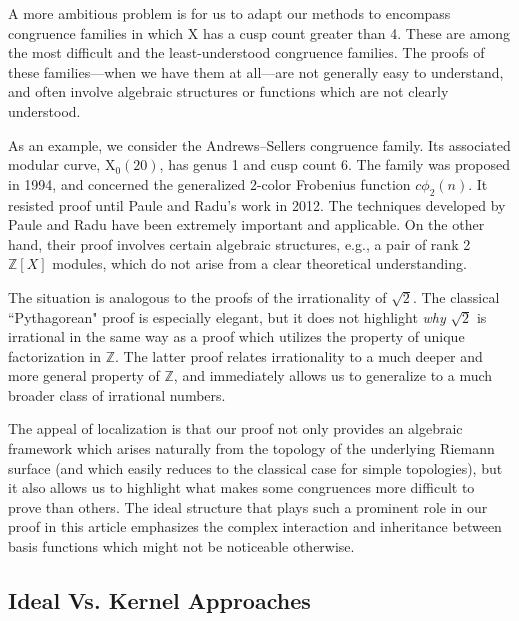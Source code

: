 \documentclass[reqno]{amsart}
\theoremstyle{definition}
\theoremstyle{remark}
\numberwithin{equation}{section}
\begin{document}
A more ambitious problem is for us to adapt our methods to encompass congruence families in which $\mathrm{X}$ has a cusp count greater than 4.  These are among the most difficult and the least-understood congruence families.  The proofs of these families---when we have them at all---are not generally easy to understand, and often involve algebraic structures or functions which are not clearly understood.  

As an example, we consider the Andrews--Sellers congruence family.  Its associated modular curve, $\mathrm{X}_0(20)$, has genus 1 and cusp count 6.  The family was proposed in 1994, and concerned the generalized 2-color Frobenius function $c\phi_2(n)$.  It resisted proof until Paule and Radu's work in 2012.  The techniques developed by Paule and Radu have been extremely important and applicable.  On the other hand, their proof involves certain algebraic structures, e.g., a pair of rank 2 $\mathbb{Z}[X]$ modules, which do not arise from a clear theoretical understanding.%

The situation is analogous to the proofs of the irrationality of $\sqrt{2}$.  The classical ``Pythagorean" proof is especially elegant, but it does not highlight \textit{why} $\sqrt{2}$ is irrational in the same way as a proof which utilizes the property of unique factorization in $\mathbb{Z}$.  The latter proof relates irrationality to a much deeper and more general property of $\mathbb{Z}$, and immediately allows us to generalize to a much broader class of irrational numbers.

The appeal of localization is that our proof not only provides an algebraic framework which arises naturally from the topology of the underlying Riemann surface (and which easily reduces to the classical case for simple topologies), but it also allows us to highlight what makes some congruences more difficult to prove than others.  The ideal structure that plays such a prominent role in our proof in this article emphasizes the complex interaction and inheritance between basis functions which might not be noticeable otherwise.

\subsection{Ideal Vs. Kernel Approaches}
\end{document}
